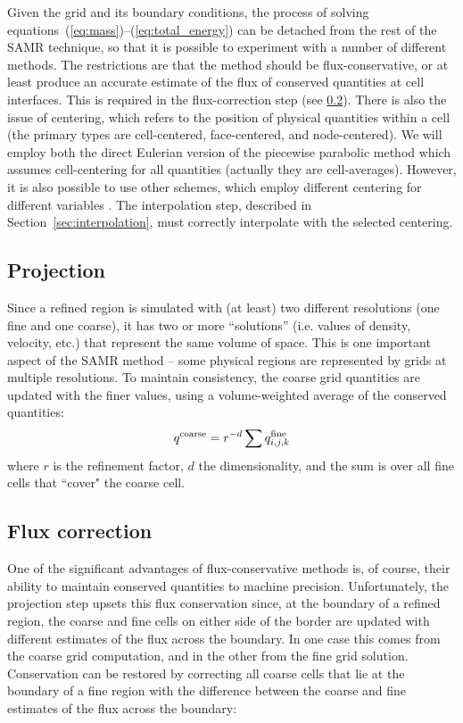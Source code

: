 Given the grid and its boundary conditions, the process of solving
equations~(\ref{eq:mass})--(\ref{eq:total_energy}) can be detached
from the rest of the SAMR technique, so that it is possible to
experiment with a number of different methods.  The restrictions are
that the method should be flux-conservative, or at least produce an
accurate estimate of the flux of conserved quantities at cell
interfaces.  This is required in the flux-correction step (see
\ref{sec:flux_correction}).  There is also the issue of centering,
which refers to the position of physical quantities within a cell (the
primary types are cell-centered, face-centered, and node-centered). We
will employ both the direct Eulerian version of the piecewise
parabolic method \citep{1984JCoPh..54..174C,1995CoPhC..89..149B} which
assumes cell-centering for all quantities (actually they are
cell-averages).  However, it is also possible to use other schemes,
which employ different centering for different variables
\citep[e.g.,][]{Stone92a}.  The interpolation step, described in
Section~\ref{sec:interpolation}, must correctly interpolate with the
selected centering.

\subsection{Projection}
\label{sec:projection}

Since a refined region is simulated with (at least) two different resolutions (one fine and one coarse), it has two or
more ``solutions'' (i.e. values of density, velocity, etc.) that represent the same volume of space.  This is one important aspect of the SAMR method -- some physical regions are represented by grids at multiple resolutions.  To
maintain consistency, the coarse grid quantities are updated with the finer values, using a volume-weighted average of the conserved quantities:
\begin{equation}
q^{\rm coarse} = r^{-d} \sum q^{\rm fine}_{i, j,k}
\end{equation}
where $r$ is the refinement factor, $d$ the dimensionality, and the sum is over all fine cells that ``cover" the coarse cell.

\subsection{Flux correction}
\label{sec:flux_correction}

One of the significant advantages of flux-conservative methods is, of course, their ability to maintain conserved quantities to machine precision.  Unfortunately, the projection step upsets this flux conservation since, at the boundary of a refined region, the coarse and fine cells on either side of the border are updated with different estimates of the flux across the boundary.  In one case this comes from the coarse grid computation, and in the other from the fine grid solution.  Conservation can be restored by correcting all coarse cells that lie at the boundary of a fine region
with the difference between the coarse and fine estimates of the flux across the boundary:

